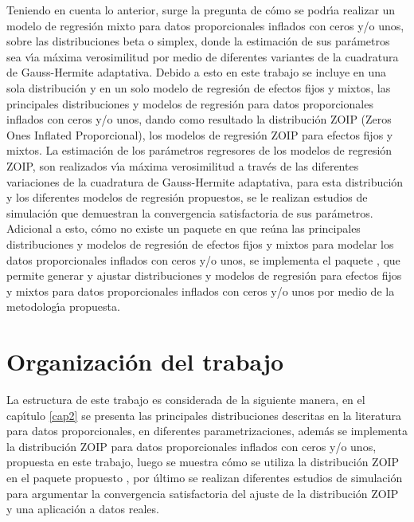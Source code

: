 Teniendo en cuenta lo anterior, surge la pregunta de c\'{o}mo se podr\'{\i}a realizar un modelo de regresi\'{o}n mixto para datos proporcionales inflados con ceros y/o unos, sobre las distribuciones beta o simplex, donde la estimaci\'{o}n de sus par\'{a}metros sea v\'{\i}a m\'{a}xima verosimilitud por medio de diferentes variantes de la cuadratura de Gauss-Hermite adaptativa. Debido a esto en este trabajo se incluye en una sola distribuci\'{o}n y en un solo modelo de regresi\'{o}n de efectos fijos y mixtos, las principales distribuciones y modelos de regresi\'{o}n para datos proporcionales inflados con ceros y/o unos, dando como resultado la distribuci\'{o}n ZOIP (Zeros Ones In\-fla\-ted Proporcional), los modelos de regresi\'{o}n ZOIP para efectos fijos y mixtos. La estimaci\'{o}n de los par\'{a}metros regresores de los modelos de regresi\'{o}n ZOIP, son realizados v\'{\i}a m\'{a}xima verosimilitud a trav\'{e}s de las diferentes variaciones de la cuadratura de Gauss-Hermite adaptativa, para esta distribuci\'{o}n y los diferentes modelos de regresi\'{o}n propuestos, se le realizan estudios de simulaci\'{o}n que demuestran la convergencia satisfactoria de sus par\'{a}metros. Adicional a esto, c\'{o}mo no existe un paquete en  que re\'{u}na las principales distribuciones y modelos de regresi\'{o}n de efectos fijos y mixtos para modelar los datos proporcionales inflados con ceros y/o unos, se implementa el paquete , que permite generar y ajustar distribuciones y modelos de regresi\'{o}n para efectos fijos y mixtos para datos proporcionales inflados con ceros y/o unos por medio de la metodolog\'{\i}a propuesta. 

\section*{Organizaci\'{o}n del trabajo}

La estructura de este trabajo es considerada de la siguiente manera, en el cap\'{\i}tulo \ref{cap2} se presenta las principales distribuciones descritas en la literatura para datos proporcionales, en diferentes parametrizaciones, adem\'{a}s se implementa la distribuci\'{o}n ZOIP para datos proporcionales inflados con ceros y/o unos, propuesta en este trabajo, luego se muestra c\'{o}mo se utiliza la distribuci\'{o}n ZOIP en el paquete propuesto , por \'{u}ltimo se realizan di\-fe\-ren\-tes estudios de simulaci\'{o}n para argumentar la convergencia satisfactoria del ajuste de la distribuci\'{o}n ZOIP y una aplicaci\'{o}n a datos reales.\\

